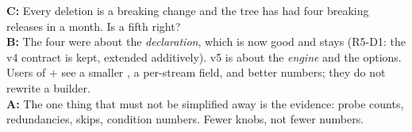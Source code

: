 \begin{panel}
\textbf{C:} Every deletion is a breaking change and the tree has had four breaking releases in a month. Is a fifth right?\\
\textbf{B:} The four were about the \emph{declaration}, which is now good and stays (R5-D1: the v4 contract is kept, extended additively). v5 is about the \emph{engine} and the options. Users of + see a smaller , a per-stream  field, and better numbers; they do not rewrite a builder.\\
\textbf{A:} The one thing that must not be simplified away is the evidence: probe counts, redundancies, skips, condition numbers. Fewer knobs, not fewer numbers.
\end{panel}
